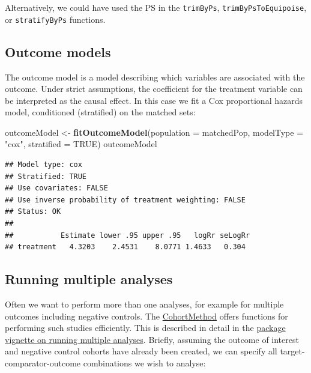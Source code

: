 \documentclass[11pt]{book}
\newenvironment{Shaded}{\begin{snugshade}}{\end{snugshade}}
\newcommand{\KeywordTok}[1]{\textcolor[rgb]{0.13,0.29,0.53}{\textbf{#1}}}
\newcommand{\DataTypeTok}[1]{\textcolor[rgb]{0.13,0.29,0.53}{#1}}
\newcommand{\StringTok}[1]{\textcolor[rgb]{0.31,0.60,0.02}{#1}}
\newcommand{\OtherTok}[1]{\textcolor[rgb]{0.56,0.35,0.01}{#1}}
\newcommand{\NormalTok}[1]{#1}
\begin{document}
Alternatively, we could have used the PS in the \texttt{trimByPs},
\texttt{trimByPsToEquipoise}, or \texttt{stratifyByPs} functions.

\subsection{Outcome models}\label{outcome-models}

The outcome model is a model describing which variables are associated
with the outcome. Under strict assumptions, the coefficient for the
treatment variable can be interpreted as the causal effect. In this case
we fit a Cox proportional hazards model, conditioned (stratified) on the
matched sets:

\begin{Shaded}
\begin{Highlighting}[]
\NormalTok{outcomeModel <-}\StringTok{ }\KeywordTok{fitOutcomeModel}\NormalTok{(}\DataTypeTok{population =}\NormalTok{ matchedPop,}
                                \DataTypeTok{modelType =} \StringTok{"cox"}\NormalTok{,}
                                \DataTypeTok{stratified =} \OtherTok{TRUE}\NormalTok{)}
\NormalTok{outcomeModel}
\end{Highlighting}
\end{Shaded}

\begin{verbatim}
## Model type: cox
## Stratified: TRUE
## Use covariates: FALSE
## Use inverse probability of treatment weighting: FALSE
## Status: OK
## 
##           Estimate lower .95 upper .95   logRr seLogRr
## treatment   4.3203    2.4531    8.0771 1.4633   0.304
\end{verbatim}

\subsection{Running multiple analyses}\label{MultipleAnalyses}

Often we want to perform more than one analyses, for example for
multiple outcomes including negative controls. The
\href{https://ohdsi.github.io/CohortMethod/}{CohortMethod} offers
functions for performing such studies efficiently. This is described in
detail in the
\href{https://ohdsi.github.io/CohortMethod/articles/MultipleAnalyses.html}{package
vignette on running multiple analyses}. Briefly, assuming the outcome of
interest and negative control cohorts have already been created, we can
specify all target-comparator-outcome combinations we wish to analyse:
\end{document}
